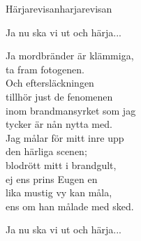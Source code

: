 \begin{song}{Härjarevisan}{harjarevisan}
\begin{vers}
Ja nu ska vi ut och härja... \\
\end{vers}
\begin{vers}
Ja mordbränder är klämmiga, \\
ta fram fotogenen.\\
Och eftersläckningen\\
tillhör just de fenomenen\\
inom brandmansyrket som jag\\
tycker är nån nytta med.\\
Jag målar för mitt inre upp\\
den härliga scenen;\\
blodrött mitt i brandgult,\\
ej ens prins Eugen en\\
lika mustig vy kan måla,\\
ens om han målade med sked.\\
\end{vers}
\begin{vers}
Ja nu ska vi ut och härja...\\
\end{vers}
\end{song}

